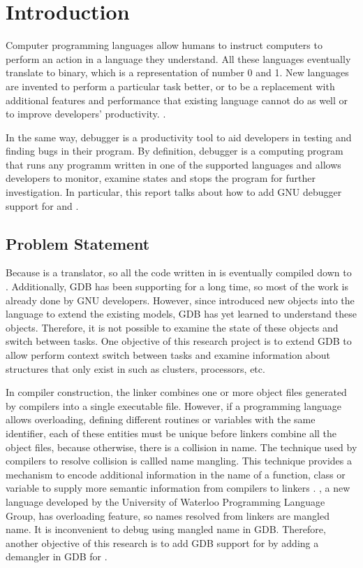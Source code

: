 \chapter{Introduction} \label{introduction}

Computer programming languages allow humans to instruct computers to perform an
action in a language they understand. All these languages eventually translate
to binary, which is a representation of number 0 and 1. New languages are
invented to perform a particular task better, or to be a replacement with
additional features and performance that existing language cannot do as well or
to improve developers' productivity.
\cite{Reference1}.

In the same way, debugger is a productivity tool to aid developers in testing
and finding bugs in their program. By definition, debugger is a computing program that runs
any programm written in one of the supported languages and allows developers to
monitor, examine states and stops the program for further investigation. In
particular, this report talks about how to add GNU debugger support for \uCPPS
and \CFA.

\section{Problem Statement}
Because \uCPPS is a translator, so all the code written in \uCPPS is eventually
compiled down to \CC. Additionally, GDB has been supporting \CCS for a long time,
so most of the work is already done by GNU developers. However, since \uCPPS introduced
new objects into the language to extend the existing models, GDB has yet learned
to understand these objects. Therefore, it is not possible to examine the state
of these objects and switch between tasks. One objective of this research
project is to extend GDB to allow perform context switch
between tasks and examine information about structures that only exist in \uCPPS
such as clusters, processors, etc.

In compiler construction, the linker combines one or more object files generated
by compilers into a single executable file. However, if a programming
language allows overloading, defining different routines or variables with the
same identifier, each of these entities must be unique before linkers
combine all the object files, because otherwise, there is a collision in name.
The technique used by compilers to resolve collision is callled name mangling.
This technique provides a mechanism to encode additional information in the
name of a function, class or variable to supply more semantic information from
compilers to linkers \cite{reference9}. \CFA, a new language developed by the University of
Waterloo Programming Language Group, has overloading feature, so names resolved from
linkers are mangled name. It is inconvenient to debug using mangled name in
GDB. Therefore, another objective of this research is to add GDB support for \CFAS by
adding a demangler in GDB for \CFA.
